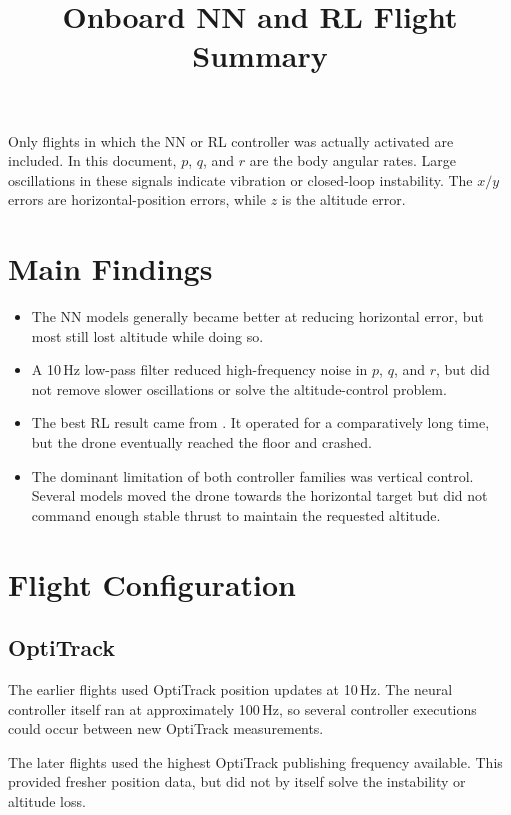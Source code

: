 \documentclass[11pt,a4paper]{article}
\title{Onboard NN and RL Flight Summary}
\author{}
\date{}
\begin{document}
\maketitle

Only flights in which the NN or RL controller was actually activated are included. In this document, $p$, $q$, and $r$ are the body angular rates. Large oscillations in these signals indicate vibration or closed-loop instability. The $x/y$ errors are horizontal-position errors, while $z$ is the altitude error.

\section{Main Findings}

\begin{itemize}
  \item The NN models generally became better at reducing horizontal error, but most still lost altitude while doing so.
  \item A 10\,Hz low-pass filter reduced high-frequency noise in $p$, $q$, and $r$, but did not remove slower oscillations or solve the altitude-control problem.
  \item The best RL result came from . It operated for a comparatively long time, but the drone eventually reached the floor and crashed.
  \item The dominant limitation of both controller families was vertical control. Several models moved the drone towards the horizontal target but did not command enough stable thrust to maintain the requested altitude.
\end{itemize}

\section{Flight Configuration}

\subsection{OptiTrack}

The earlier flights used OptiTrack position updates at 10\,Hz. The neural controller itself ran at approximately 100\,Hz, so several controller executions could occur between new OptiTrack measurements.

The later flights used the highest OptiTrack publishing frequency available. This provided fresher position data, but did not by itself solve the instability or altitude loss.
\end{document}
